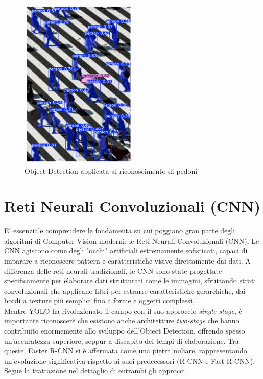 \documentclass[12pt]{article}
\begin{document}
\begin{figure}[H]
    \centering
    \includegraphics[width=0.50\textwidth]{./img/object-detection-example2.png}
    \caption{Object Detection applicata al riconoscimento di pedoni}
    \label{fig:pedestrians-example}
\end{figure}

\section{Reti Neurali Convoluzionali (CNN)}
E' essenziale comprendere le fondamenta su cui poggiano gran parte degli algoritmi di Computer Vision moderni: le Reti Neurali Convoluzionali (CNN). Le CNN agiscono come degli "occhi" artificiali estremamente sofisticati, capaci di imparare a riconoscere pattern e caratteristiche visive direttamente dai dati. A differenza delle reti neurali tradizionali, le CNN sono state progettate specificamente per elaborare dati strutturati come le immagini, sfruttando strati convoluzionali che applicano filtri per estrarre caratteristiche gerarchiche, dai bordi a texture più semplici fino a forme e oggetti complessi.\\ 
Mentre YOLO ha rivoluzionato il campo con il suo approccio \textit{single-stage}, è importante riconoscere che esistono anche architetture \textit{two-stage} che hanno contribuito enormemente allo sviluppo dell'Object Detection, offrendo spesso un'accuratezza superiore, seppur a discapito dei tempi di elaborazione. Tra queste, Faster R-CNN si è affermata come una pietra miliare, rappresentando un'evoluzione significativa rispetto ai suoi predecessori (R-CNN e Fast R-CNN). Segue la trattazione nel dettaglio di entrambi gli approcci.
\end{document}
